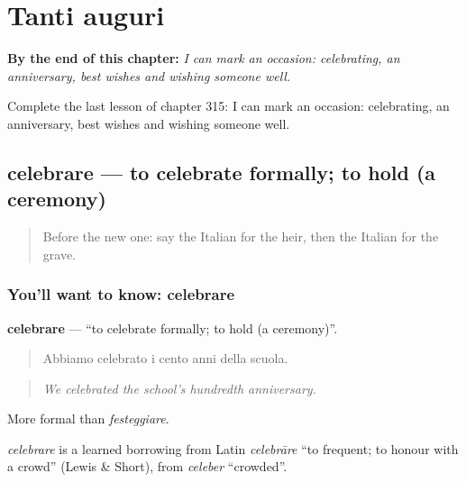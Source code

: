 
\chapter{Tanti auguri}
\label{ch:it-tanti-auguri}

\begin{chapteropening}
\textbf{By the end of this chapter:} \emph{I can mark an occasion: celebrating, an anniversary, best wishes and wishing someone well.}

Complete the last lesson of chapter 315: I can mark an occasion: celebrating, an anniversary, best wishes and wishing someone well.
\end{chapteropening}

\section[celebrare]{celebrare — to celebrate formally; to hold (a ceremony)}

\label{lesson:IT-C315-celebrare}



\begin{quote}
Before the new one: say the Italian for the heir, then the Italian for the grave.
\end{quote}

\subsection*{You'll want to know: celebrare}
\textbf{celebrare} — \textquotedblleft{}to celebrate formally; to hold (a ceremony)\textquotedblright{}.

\begin{quote}
Abbiamo celebrato i cento anni della scuola.
\end{quote}

\begin{quote}
\emph{We celebrated the school's hundredth anniversary.}
\end{quote}

More formal than \emph{festeggiare}.

\begin{cousinweb}
\emph{celebrare} is a learned borrowing from Latin \emph{celebrāre} \textquotedblleft{}to frequent; to honour with a crowd\textquotedblright{} (Lewis \& Short), from \emph{celeber} \textquotedblleft{}crowded\textquotedblright{}.
\end{cousinweb}

